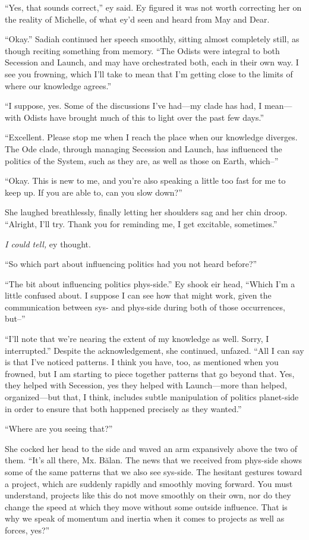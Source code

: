 ``Yes, that sounds correct,'' ey said. Ey figured it was not worth correcting her on the reality of Michelle, of what ey'd seen and heard from May and Dear.

``Okay.'' Sadiah continued her speech smoothly, sitting almost completely still, as though reciting something from memory. ``The Odists were integral to both Secession and Launch, and may have orchestrated both, each in their own way. I see you frowning, which I'll take to mean that I'm getting close to the limits of where our knowledge agrees.''

``I suppose, yes. Some of the discussions I've had---my clade has had, I mean---with Odists have brought much of this to light over the past few days.''

``Excellent. Please stop me when I reach the place when our knowledge diverges. The Ode clade, through managing Secession and Launch, has influenced the politics of the System, such as they are, as well as those on Earth, which--''

``Okay. This is new to me, and you're also speaking a little too fast for me to keep up. If you are able to, can you slow down?''

She laughed breathlessly, finally letting her shoulders sag and her chin droop. ``Alright, I'll try. Thank you for reminding me, I get excitable, sometimes.''

\emph{I could tell,} ey thought.

``So which part about influencing politics had you not heard before?''

``The bit about influencing politics phys-side.'' Ey shook eir head, ``Which I'm a little confused about. I suppose I can see how that might work, given the communication between sys- and phys-side during both of those occurrences, but--''

``I'll note that we're nearing the extent of my knowledge as well. Sorry, I interrupted.'' Despite the acknowledgement, she continued, unfazed. ``All I can say is that I've noticed patterns. I think you have, too, as mentioned when you frowned, but I am starting to piece together patterns that go beyond that. Yes, they helped with Secession, yes they helped with Launch---more than helped, organized---but that, I think, includes subtle manipulation of politics planet-side in order to ensure that both happened precisely as they wanted.''

``Where are you seeing that?''

She cocked her head to the side and waved an arm expansively above the two of them. ``It's all there, Mx. Bălan. The news that we received from phys-side shows some of the same patterns that we also see sys-side. The hesitant gestures toward a project, which are suddenly rapidly and smoothly moving forward. You must understand, projects like this do not move smoothly on their own, nor do they change the speed at which they move without some outside influence. That is why we speak of momentum and inertia when it comes to projects as well as forces, yes?''

